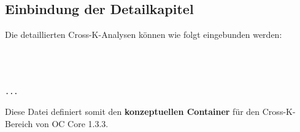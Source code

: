 \subsection{Einbindung der Detailkapitel}
\noindent Die detaillierten Cross-K-Analysen können wie folgt eingebunden werden:
\begin{verbatim}



...

\end{verbatim}

\noindent Diese Datei definiert somit den \textbf{konzeptuellen Container} für den
Cross-K-Bereich von OC Core 1.3.3.
